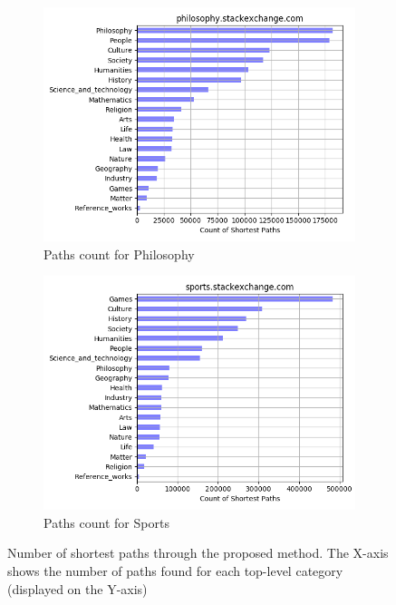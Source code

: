 \begin{figure}[H]
     \begin{subfigure}{0.5\textwidth}
    \centering
        \includegraphics[width=1\linewidth]{imgs/path-counts/philosophy_stackexchange_com}
        \caption{Paths count for Philosophy}
        \label{fig:path-philosophy}
    \end{subfigure}%
    \begin{subfigure}{0.5\textwidth}
    \centering
        \includegraphics[width=1\linewidth]{imgs/path-counts/sports_stackexchange_com}
        \caption{Paths count for Sports}
        \label{fig:path-sports}
    \end{subfigure}
   
 
    \caption{Number of shortest paths through the proposed method. The X-axis shows the number of paths found for each top-level category (displayed on the Y-axis) }
    \label{fig:complete-path-count-distribution}
    
\end{figure}
